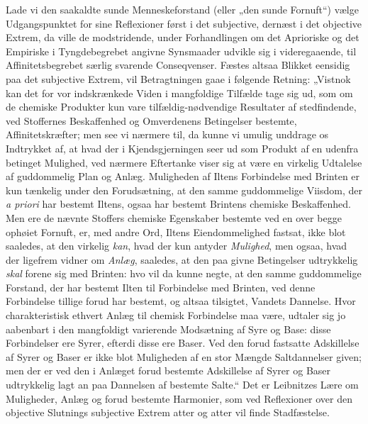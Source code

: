 \documentclass[12pt]{book}
\newcommand{\opage}[1]{\marginnote{\footnotesize\textit{[#1]}}}
\begin{document}
Lade vi den saakaldte sunde Menneskeforstand (eller „den sunde Fornuft“) vælge Udgangspunktet for sine Reflexioner først i det subjective, dernæst i det objective Extrem, da ville de modstridende, under Forhandlingen om det Aprioriske og det Empiriske i Tyngdebegrebet angivne Synsmaader udvikle sig i videregaaende, til Affinitetsbegrebet særlig svarende Conseqvenser. Fæstes altsaa Blikket eensidig paa det subjective Extrem, vil Betragtningen gaae i følgende Retning: „Vistnok kan det for vor indskrænkede Viden i mangfoldige Tilfælde tage sig ud, som om de chemiske Produkter kun vare tilfældig-nødvendige Resultater af stedfindende, ved Stoffernes Beskaffenhed og Omverdenens Betingelser bestemte, Affinitetskræfter; men see vi nærmere til, da kunne vi umulig unddrage os Indtrykket af, at hvad der i Kjendsgjerningen seer ud som Produkt af en udenfra betinget Mulighed, ved nærmere Eftertanke viser sig at være en virkelig Udtalelse af guddommelig Plan og Anlæg. Muligheden af Iltens Forbindelse med Brinten er kun
\opage{418}tænkelig under den Forudsætning, at den samme guddommelige Viisdom, der \textit{a priori} har bestemt Iltens, ogsaa har bestemt Brintens chemiske Beskaffenhed. Men ere de nævnte Stoffers chemiske Egenskaber bestemte ved en over begge ophøiet Fornuft, er, med andre Ord, Iltens Eiendommelighed fastsat, ikke blot saaledes, at den virkelig \emph{kan}, hvad der kun antyder \emph{Mulighed}, men ogsaa, hvad der ligefrem vidner om \emph{Anlæg}, saaledes, at den paa givne Betingelser udtrykkelig \emph{skal} forene sig med Brinten: hvo vil da kunne negte, at den samme guddommelige Forstand, der har bestemt Ilten til Forbindelse med Brinten, ved denne Forbindelse tillige forud har bestemt, og altsaa tilsigtet, Vandets Dannelse. Hvor charakteristisk ethvert Anlæg til chemisk Forbindelse maa være, udtaler sig jo aabenbart i den mangfoldigt varierende Modsætning af Syre og Base: disse Forbindelser ere Syrer, efterdi disse ere Baser. Ved den forud fastsatte Adskillelse af Syrer og Baser er ikke blot Muligheden af en stor Mængde Saltdannelser given; men der er ved den i Anlæget forud bestemte Adskillelse af Syrer og Baser udtrykkelig lagt an paa Dannelsen af bestemte Salte.“ Det er Leibnitzes Lære om Muligheder, Anlæg og forud bestemte Harmonier, som ved Reflexioner over den objective Slutnings subjective Extrem atter og atter vil finde Stadfæstelse.
\end{document}

